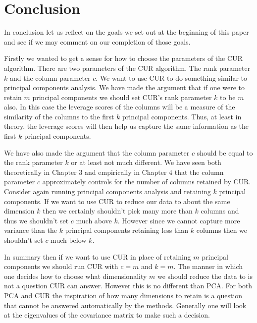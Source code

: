 \documentclass{book}
\begin{document}

\chapter*{Conclusion}

In conclusion let us reflect on the goals we set out at the beginning of this paper and see if we may comment on our completion of those goals. 

\vspace{.5cm}
Firstly we wanted to get a sense for how to choose the parameters of the CUR algorithm. There are two parameters of the CUR algorithm. The rank parameter $k$ and the column parameter $c$. We want to use CUR to do something similar to principal components analysis. We have made the argument that if one were to retain $m$ principal components we should set CUR's rank parameter $k$ to be $m$ also. In this case the leverage scores of the columns will be a measure of the similarity of the columns to the first $k$ principal components. Thus, at least in theory, the leverage scores will then help us capture the same information as the first $k$ principal components. 

We have also made the argument that the column parameter $c$ should be equal to the rank parameter $k$ or at least not much different. We have seen both theoretically in Chapter 3 and empirically in Chapter 4 that the column parameter $c$ approximately controls for the number of columns retained by CUR. Consider again running principal components analysis and retaining $k$ principal components. If we want to use CUR to reduce our data to about the same dimension $k$ then we certainly shouldn't pick many more than $k$ columns and thus we shouldn't set $c$ much above $k$. However since we cannot capture more variance than the $k$ principal components retaining less than $k$ columns then we shouldn't set $c$ much below $k$. 

In summary then if we want to use CUR in place of retaining $m$ principal components we should run CUR with $c=m$ and $k=m$. The manner in which one decides how to choose what dimensionality $m$ we should reduce the data to is not a question CUR can answer. However this is no different than PCA. For both PCA and CUR the inspiration of how many dimensions to retain is a question that cannot be answered automatically by the methods. Generally one will look at the eigenvalues of the covariance matrix to make such a decision. 
\end{document}
